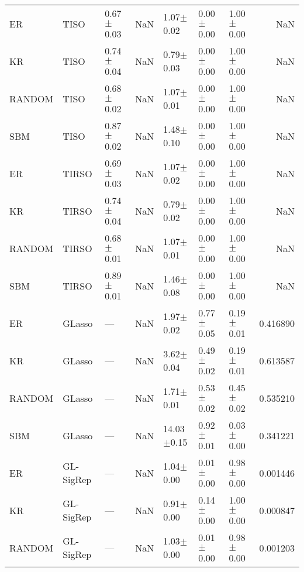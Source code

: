 \begin{tabular}{lllllllr}
ER & TISO & 0.67{\scriptsize$\pm$0.03} & NaN & 1.07{\scriptsize$\pm$0.02} & 0.00{\scriptsize$\pm$0.00} & 1.00{\scriptsize$\pm$0.00} & NaN \\
KR & TISO & 0.74{\scriptsize$\pm$0.04} & NaN & 0.79{\scriptsize$\pm$0.03} & 0.00{\scriptsize$\pm$0.00} & 1.00{\scriptsize$\pm$0.00} & NaN \\
RANDOM & TISO & 0.68{\scriptsize$\pm$0.02} & NaN & 1.07{\scriptsize$\pm$0.01} & 0.00{\scriptsize$\pm$0.00} & 1.00{\scriptsize$\pm$0.00} & NaN \\
SBM & TISO & 0.87{\scriptsize$\pm$0.02} & NaN & 1.48{\scriptsize$\pm$0.10} & 0.00{\scriptsize$\pm$0.00} & 1.00{\scriptsize$\pm$0.00} & NaN \\
ER & TIRSO & 0.69{\scriptsize$\pm$0.03} & NaN & 1.07{\scriptsize$\pm$0.02} & 0.00{\scriptsize$\pm$0.00} & 1.00{\scriptsize$\pm$0.00} & NaN \\
KR & TIRSO & 0.74{\scriptsize$\pm$0.04} & NaN & 0.79{\scriptsize$\pm$0.02} & 0.00{\scriptsize$\pm$0.00} & 1.00{\scriptsize$\pm$0.00} & NaN \\
RANDOM & TIRSO & 0.68{\scriptsize$\pm$0.01} & NaN & 1.07{\scriptsize$\pm$0.01} & 0.00{\scriptsize$\pm$0.00} & 1.00{\scriptsize$\pm$0.00} & NaN \\
SBM & TIRSO & 0.89{\scriptsize$\pm$0.01} & NaN & 1.46{\scriptsize$\pm$0.08} & 0.00{\scriptsize$\pm$0.00} & 1.00{\scriptsize$\pm$0.00} & NaN \\
ER & GLasso & --- & NaN & 1.97{\scriptsize$\pm$0.02} & 0.77{\scriptsize$\pm$0.05} & 0.19{\scriptsize$\pm$0.01} & 0.416890 \\
KR & GLasso & --- & NaN & 3.62{\scriptsize$\pm$0.04} & 0.49{\scriptsize$\pm$0.02} & 0.19{\scriptsize$\pm$0.01} & 0.613587 \\
RANDOM & GLasso & --- & NaN & 1.71{\scriptsize$\pm$0.01} & 0.53{\scriptsize$\pm$0.02} & 0.45{\scriptsize$\pm$0.02} & 0.535210 \\
SBM & GLasso & --- & NaN & 14.03{\scriptsize$\pm$0.15} & 0.92{\scriptsize$\pm$0.01} & 0.03{\scriptsize$\pm$0.00} & 0.341221 \\
ER & GL-SigRep & --- & NaN & 1.04{\scriptsize$\pm$0.00} & 0.01{\scriptsize$\pm$0.00} & 0.98{\scriptsize$\pm$0.00} & 0.001446 \\
KR & GL-SigRep & --- & NaN & 0.91{\scriptsize$\pm$0.00} & 0.14{\scriptsize$\pm$0.00} & 1.00{\scriptsize$\pm$0.00} & 0.000847 \\
RANDOM & GL-SigRep & --- & NaN & 1.03{\scriptsize$\pm$0.00} & 0.01{\scriptsize$\pm$0.00} & 0.98{\scriptsize$\pm$0.00} & 0.001203 \\

\end{tabular}

